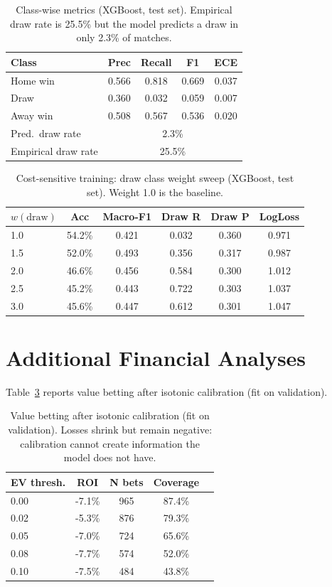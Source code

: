 \documentclass[10pt]{article}
\begin{document}
\begin{table}[H]
\centering
\caption{Class-wise metrics (XGBoost, test set). Empirical draw rate is 25.5\%
but the model predicts a draw in only 2.3\% of matches.}
\label{tab:class}
\small
\begin{tabular}{lcccc}
\toprule
Class & Prec & Recall & F1 & ECE \\
\midrule
Home win & 0.566 & 0.818 & 0.669 & 0.037 \\
Draw & 0.360 & 0.032 & 0.059 & 0.007 \\
Away win & 0.508 & 0.567 & 0.536 & 0.020 \\
\midrule
Pred.\ draw rate & \multicolumn{4}{c}{2.3\%} \\
Empirical draw rate & \multicolumn{4}{c}{25.5\%} \\
\bottomrule
\end{tabular}
\end{table}

\begin{table}[H]
\centering
\caption{Cost-sensitive training: draw class weight sweep (XGBoost, test set).
Weight 1.0 is the baseline.}
\label{tab:cost}
\begin{tabular}{lccccc}
\toprule
$w(\mathrm{draw})$ & Acc & Macro-F1 & Draw R & Draw P & LogLoss \\
\midrule
1.0 & 54.2\% & 0.421 & 0.032 & 0.360 & 0.971 \\
1.5 & 52.0\% & 0.493 & 0.356 & 0.317 & 0.987 \\
2.0 & 46.6\% & 0.456 & 0.584 & 0.300 & 1.012 \\
2.5 & 45.2\% & 0.443 & 0.722 & 0.303 & 1.037 \\
3.0 & 45.6\% & 0.447 & 0.612 & 0.301 & 1.047 \\
\bottomrule
\end{tabular}
\end{table}

\section{Additional Financial Analyses}
\label{app:financial}
Table~\ref{tab:isoton} reports value betting after isotonic calibration (fit on
validation).

\begin{table}[H]
\centering
\caption{Value betting after isotonic calibration (fit on validation). Losses
shrink but remain negative: calibration cannot create information the model
does not have.}
\label{tab:isoton}
\small
\begin{tabular}{lcccc}
\toprule
EV thresh. & ROI & N bets & Coverage \\
\midrule
0.00 & -7.1\% & 965 & 87.4\% \\
0.02 & -5.3\% & 876 & 79.3\% \\
0.05 & -7.0\% & 724 & 65.6\% \\
0.08 & -7.7\% & 574 & 52.0\% \\
0.10 & -7.5\% & 484 & 43.8\% \\
\bottomrule
\end{tabular}
\end{table}
\end{document}
